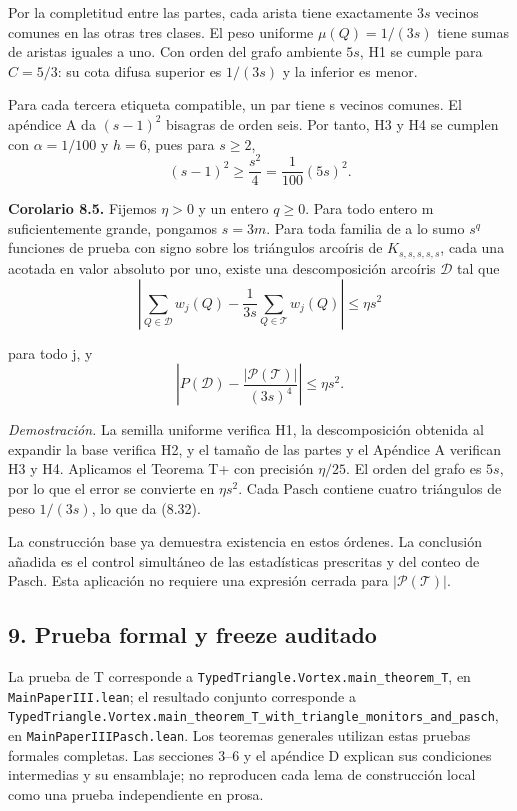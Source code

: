 \documentclass[spanish,11pt,a4paper]{article}
\begin{document}
Por la completitud entre las partes, cada arista tiene exactamente \(3s\) vecinos comunes en las otras tres clases. El peso uniforme \(\mu(Q)=1/(3s)\) tiene sumas de aristas iguales a uno. Con orden del grafo ambiente \(5s\), H1 se cumple para \(C=5/3\): su cota difusa superior es \(1/(3s)\) y la inferior es menor.

Para cada tercera etiqueta compatible, un par tiene s vecinos comunes. El apéndice A da \((s-1)^2\) bisagras de orden seis. Por tanto, H3 y H4 se cumplen con \(\alpha=1/100\) y \(h=6\), pues para \(s\geq2\),
\[(s-1)^2\geq\frac{s^2}{4}=\frac1{100}(5s)^2.                        \tag{8.30}\]

\textbf{Corolario 8.5.} Fijemos \(\eta>0\) y un entero \(q\geq0\). Para todo entero m suficientemente grande, pongamos \(s=3m\). Para toda familia de a lo sumo \(s^q\) funciones de prueba con signo sobre los triángulos arcoíris de \(K_{s,s,s,s,s}\), cada una acotada en valor absoluto por uno, existe una descomposición arcoíris \(\mathcal D\) tal que
\[\left|\sum_{Q\in\mathcal D}w_j(Q)
-\frac1{3s}\sum_{Q\in\mathcal T}w_j(Q)\right|\leq\eta s^2          \tag{8.31}\]

para todo j, y
\[\left|P(\mathcal D)-\frac{|\mathcal P(\mathcal T)|}{(3s)^4}\right|
\leq\eta s^2.                                                       \tag{8.32}\]

\emph{Demostración.} La semilla uniforme verifica H1, la descomposición obtenida al expandir la base verifica H2, y el tamaño de las partes y el Apéndice A verifican H3 y H4. Aplicamos el Teorema T+ con precisión \(\eta/25\). El orden del grafo es \(5s\), por lo que el error se convierte en \(\eta s^2\). Cada Pasch contiene cuatro triángulos de peso \(1/(3s)\), lo que da (8.32).

La construcción base ya demuestra existencia en estos órdenes. La conclusión añadida es el control simultáneo de las estadísticas prescritas y del conteo de Pasch. Esta aplicación no requiere una expresión cerrada para \(|\mathcal P(\mathcal T)|\).

\subsection{9. Prueba formal y freeze auditado}\label{prueba-formal-y-freeze-auditado}

La prueba de T corresponde a \texttt{Typed\allowbreak{}Triangle.\allowbreak{}Vortex.\allowbreak{}main\_\allowbreak{}theorem\_\allowbreak{}T}, en \texttt{Main\allowbreak{}Paper\allowbreak{}III.\allowbreak{}lean}; el resultado conjunto corresponde a \texttt{Typed\allowbreak{}Triangle.\allowbreak{}Vortex.\allowbreak{}main\_\allowbreak{}theorem\_\allowbreak{}T\_\allowbreak{}with\_\allowbreak{}triangle\_\allowbreak{}monitors\_\allowbreak{}and\_\allowbreak{}pasch}, en \texttt{Main\allowbreak{}Paper\allowbreak{}IIIPasch.\allowbreak{}lean}. Los teoremas generales utilizan estas pruebas formales completas. Las secciones 3--6 y el apéndice D explican sus condiciones intermedias y su ensamblaje; no reproducen cada lema de construcción local como una prueba independiente en prosa.
\end{document}
